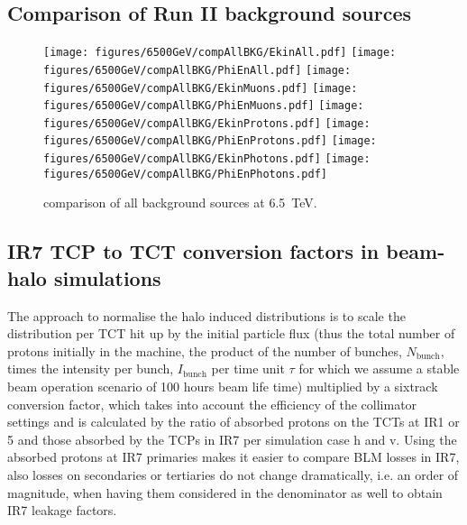 \subsection{Comparison of Run II background sources}
\begin{figure}
\begin{center}
  \texttt{[image: figures/6500GeV/compAllBKG/EkinAll.pdf]}
  \texttt{[image: figures/6500GeV/compAllBKG/PhiEnAll.pdf]}
  \texttt{[image: figures/6500GeV/compAllBKG/EkinMuons.pdf]}
  \texttt{[image: figures/6500GeV/compAllBKG/PhiEnMuons.pdf]}
  \texttt{[image: figures/6500GeV/compAllBKG/EkinProtons.pdf]}
  \texttt{[image: figures/6500GeV/compAllBKG/PhiEnProtons.pdf]}
  \texttt{[image: figures/6500GeV/compAllBKG/EkinPhotons.pdf]}
  \texttt{[image: figures/6500GeV/compAllBKG/PhiEnPhotons.pdf]}
\end{center}
\vspace{-0.6cm}
 \caption{comparison of all background sources at 6.5~TeV.
  \label{compAllBKG_6.5}}
\end{figure}


\subsection{IR7 TCP to TCT conversion factors in beam-halo simulations}
The approach to normalise the halo induced distributions is to scale the distribution per TCT hit up by the initial particle flux (thus the total number of protons initially in the machine, the product of the number of bunches, $N_{\mathrm{bunch}}$, times the intensity per bunch, $I_{\mathrm{bunch}}$ per time unit $\tau$ for which we assume a stable beam operation scenario of 100 hours beam life time) multiplied by a sixtrack conversion factor, which takes into account the efficiency of the collimator settings and is calculated by the ratio of absorbed protons on the TCTs at IR1 or 5 and those absorbed by the TCPs in IR7 per simulation case h and v. Using the absorbed protons at IR7 primaries makes it easier to compare BLM losses in IR7, also losses on secondaries or tertiaries do not change dramatically, i.e. an order of magnitude, when having them considered in the denominator as well to obtain IR7 leakage factors.

